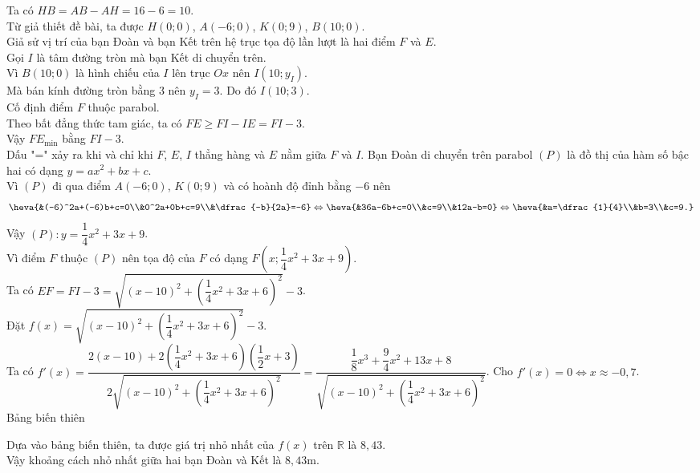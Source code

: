 \begin{ex}
{Ta có $HB=AB-AH=16-6=10$.\\
Từ giả thiết đề bài, ta được $H(0;0)$, $A(-6;0)$, $K(0;9)$, $B(10;0)$.\\
Giả sử vị trí của bạn Đoàn và bạn Kết trên hệ trục tọa độ lần lượt là hai điểm $F$ và $E$.\\
Gọi $I$ là tâm đường tròn mà bạn Kết di chuyển trên.\\
Vì $B(10;0)$ là hình chiếu của $I$ lên trục $Ox$ nên $I(10;y_I)$.\\
Mà bán kính đường tròn bằng $3$ nên $y_I=3$. Do đó $I(10;3)$.\\
Cố định điểm $F$ thuộc parabol. \\
Theo bất đẳng thức tam giác, ta có $FE \ge FI-IE = FI-3$.\\
Vậy $FE_\text{min}$ bằng $FI-3$.\\
Dấu "=" xảy ra khi và chỉ khi $F$, $E$, $I$ thẳng hàng và $E$ nằm giữa $F$ và $I$.
Bạn Đoàn di chuyển trên parabol $(P)$ là đồ thị của hàm số bậc hai có dạng $y=ax^2+bx+c$.\\
Vì $(P)$ đi qua điểm $A(-6;0)$, $K(0;9)$ và có hoành độ đỉnh bằng $-6$ nên
$$\heva{&(-6)^2a+(-6)b+c=0\\&0^2a+0b+c=9\\&\dfrac{-b}{2a}=-6} \Leftrightarrow \heva{&36a-6b+c=0\\&c=9\\&12a-b=0} \Leftrightarrow \heva{&a=\dfrac{1}{4}\\&b=3\\&c=9.}$$
Vậy $(P) \colon y =\dfrac{1}{4}x^2+3x+9$.\\
Vì điểm $F$ thuộc $(P)$ nên tọa độ của $F$ có dạng $F \left(x;\dfrac{1}{4}x^2+3x+9\right)$.\\
Ta có $EF=FI-3=\sqrt{(x-10)^2+\left(\dfrac{1}{4}x^2+3x+6\right)^2}-3$.\\
Đặt $f(x)=\sqrt{(x-10)^2+\left(\dfrac{1}{4}x^2+3x+6\right)^2}-3$.\\
Ta có $f'(x)=\dfrac{2(x-10)+2\left(\dfrac{1}{4}x^2+3x+6\right)\left(\dfrac{1}{2}x+3\right)}{2\sqrt{(x-10)^2+\left(\dfrac{1}{4}x^2+3x+6\right)^2}}=\dfrac{\dfrac{1}{8}x^3+\dfrac{9}{4}x^2+13x+8}{\sqrt{(x-10)^2+\left(\dfrac{1}{4}x^2+3x+6\right)^2}}$.
Cho $f'(x)=0 \Leftrightarrow x \approx -0{,}7$.\\
Bảng biến thiên
\begin{center}
\end{center}
Dựa vào bảng biến thiên, ta được giá trị nhỏ nhất của $f(x)$ trên $\mathbb{R}$ là $8{,}43$.\\
Vậy khoảng cách nhỏ nhất giữa hai bạn Đoàn và Kết là $8{,}43$m.
}
\end{ex}

